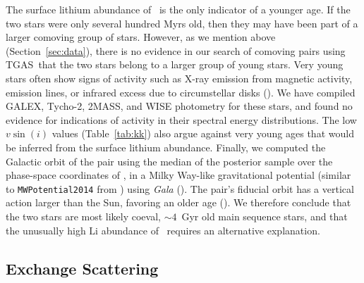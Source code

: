 \documentclass[modern, letterpaper]{aastex61}
\newcommand{\project}[1]{\textsl{#1}}
\newcommand{\acronym}[1]{{\small{#1}}}
\newcommand{\sectionname}{Section}
\newcommand{\tgas}{\acronym{TGAS}}
\newcommand*\elem[1]{\ensuremath{\mathrm{#1}}}
\newcommand{\sunanalog}{\text{Krios}}
\newcommand{\bizarreone}{\text{Kronos}}
\renewcommand\tablename{Table}
\begin{document}
The surface lithium abundance of \bizarreone\ is the only indicator of a
younger age.
If the two stars were only several hundred Myrs old, then
they may have been part of a larger comoving group of stars.
However, as we mention above (\sectionname~\ref{sec:data}), there is no
evidence in our search of comoving pairs using \tgas\ that the two stars belong
to a larger group of young stars.
Very young stars often show signs of activity such as
X-ray emission from magnetic activity, emission lines, or infrared excess due to
circumstellar disks (\citealt{1999ARA&A..37..363F,1987ApJ...312..788A}).
We have compiled GALEX, Tycho-2, 2MASS, and WISE photometry for these stars,
and found no evidence for indications of activity in their spectral energy
distributions.
%
The low $v\sin(i)$ values (\tablename~\ref{tab:kk}) also argue against very
young ages that would be inferred from the surface lithium abundance.
Finally, we computed the Galactic orbit of the pair using the median of the
posterior sample over the phase-space coordinates of \sunanalog, in a Milky
Way-like gravitational potential (similar to \texttt{MWPotential2014} from
\citealt{Bovy:2015}) using \project{Gala} (\citealt{gala}).
The pair's fiducial orbit has a vertical action larger than the Sun, favoring
an older age (\citealt{Wielen:1977,Aumer:2016}).
We therefore conclude that the two stars are most likely coeval, $\sim 4$~Gyr
old main sequence stars, and that the unusually high \elem{Li} abundance of
\bizarreone\ requires an alternative explanation.


\subsection{Exchange Scattering}
\label{sub:exchange_scattering}
\end{document}

